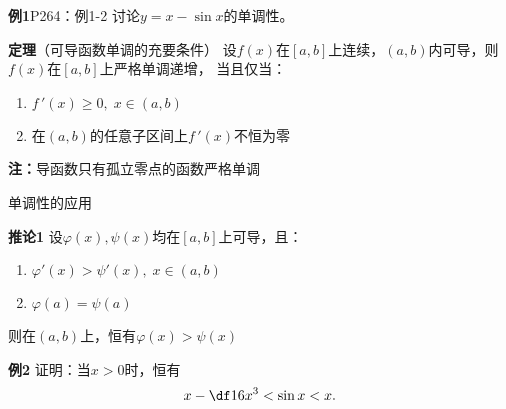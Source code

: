 
\begin{frame}
	\linespread{1.2}
	\begin{exampleblock}{{\bf 例1}\hfill P264：例1-2}
		讨论$y=x-\sin x$的单调性。
	\end{exampleblock}\pause 
	\bigskip
	\begin{alertblock}{{\bf 定理}（可导函数单调的充要条件）\hfill}
		设$f(x)$在$[a,b]$上连续，$(a,b)$内可导，则$f(x)$在$[a,b]$上严格单调递增，
		当且仅当：
		\begin{enumerate}
		  \item $f\,'(x)\geq 0,\;x\in(a,b)$
		  \item 在$(a,b)$的任意子区间上$f\,'(x)$不恒为零
		\end{enumerate}
	\end{alertblock}\pause
	{\bf 注：}导函数只有{\bb 孤立零点}的函数严格单调
\end{frame}

\begin{frame}{单调性的应用}
	\linespread{1.2}
	\begin{alertblock}{{\bf 推论1}\hfill}
		设$\varphi(x),\psi(x) $均在$[a,b]$上可导，且：
		\begin{enumerate}
		  \item $\varphi'(x)>\psi'(x),\;x\in(a,b)$
		  \item $\varphi(a)=\psi(a)$
		\end{enumerate}
		则在$(a,b)$上，恒有$\varphi(x)>\psi(x)$
	\end{alertblock}\pause 
	\begin{exampleblock}{{\bf 例2}\hfill}
		证明：当$x>0$时，恒有
		$$x-\df 16x^3<\sin x<x.$$
	\end{exampleblock}
\end{frame}

